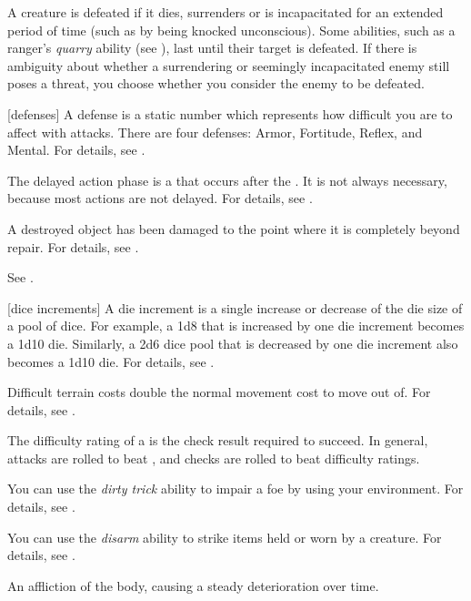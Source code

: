  A creature is defeated if it dies, surrenders or is incapacitated for an extended period of time (such as by being knocked unconscious).
Some abilities, such as a ranger's \textit{quarry} ability (see ), last until their target is defeated.
If there is ambiguity about whether a surrendering or seemingly incapacitated enemy still poses a threat, you choose whether you consider the enemy to be defeated.

[defenses] A defense is a static number which represents how difficult you are to affect with attacks.
There are four defenses: Armor, Fortitude, Reflex, and Mental.
For details, see .

 The delayed action phase is a  that occurs after the .
It is not always necessary, because most actions are not delayed.
For details, see .

 A destroyed object has been damaged to the point where it is completely beyond repair.
For details, see .

 See .

[dice increments] A die increment is a single increase or decrease of the die size of a pool of dice.
For example, a 1d8 that is increased by one die increment becomes a 1d10 die.
Similarly, a 2d6 dice pool that is decreased by one die increment also becomes a 1d10 die.
For details, see .

 Difficult terrain costs double the normal movement cost to move out of.
For details, see .

 The difficulty rating of a  is the check result required to succeed.
In general, attacks are rolled to beat , and checks are rolled to beat difficulty ratings.

 You can use the \textit{dirty trick} ability to impair a foe by using your environment.
For details, see .

 You can use the \textit{disarm} ability to strike items held or worn by a creature.
For details, see .

 An affliction of the body, causing a steady deterioration over time.

